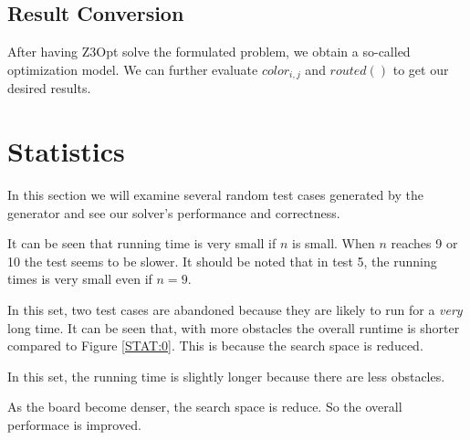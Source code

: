 \documentclass{article}
\begin{document}
\begin{spacing}{1.1}
    \subsection{Result Conversion}
    After having Z3Opt solve the formulated problem, we obtain a so-called optimization model. We can further evaluate $color_{i, j}$ and $routed()$ to get our desired results.
    \section{Statistics}
    In this section we will examine several random test cases generated by the generator and see our solver's performance and correctness.

    \begin{table}[H]
        \centering
        \caption{Set 0 (dense (more terminals) and small board) \label{STAT:0}}
    \end{table}

    It can be seen that running time is very small if $n$ is small. When $n$ reaches 9 or 10 the test seems to be slower. It should be noted that in test 5, the running times is very small even if $n = 9$.

    \begin{table}[H]
        \centering
        \caption{Set 1 (small board, more obstacles)}
    \end{table}

    In this set, two test cases are abandoned because they are likely to run for a \emph{very} long time. It can be seen that, with more obstacles the overall runtime is shorter compared to Figure \ref{STAT:0}. This is because the search space is reduced.

    \begin{table}[H]
        \centering
        \caption{Set 2 (small board, less obstacles)}
    \end{table}

    In this set, the running time is slightly longer because there are less obstacles.

    \begin{table}[H]
        \centering
        \caption{Set 3 (small board, dense terminals)}
    \end{table}
    As the board become denser, the search space is reduce. So the overall performace is improved.


\end{spacing}
\end{document}

